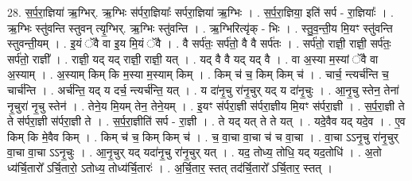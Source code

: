 \documentclass[17pt]{extarticle}
\begin{document}
28. स॒र्प॒रा॒ज्ञिया॑ ऋ॒ग्भिर्. ऋ॒ग्भिः स॑र्परा॒ज्ञियाः᳚ सर्परा॒ज्ञिया॑ ऋ॒ग्भिः । . स॒र्प॒रा॒ज्ञिया॒ इति॑ सर्प - रा॒ज्ञियाः᳚ । . ऋ॒ग्भिः स्तु॑वन्ति स्तुवन् त्यृ॒ग्भिर्. ऋ॒ग्भिः स्तु॑वन्ति । . ऋ॒ग्भिरित्यृ॑क् - भिः । . स्तु॒व॒न्ती॒य मि॒यꣳ स्तु॑वन्ति स्तुवन्ती॒यम् । . इ॒यं ॅवै वा इ॒य मि॒यं ॅवै । . वै सर्प॑तः॒ सर्प॑तो॒ वै वै सर्प॑तः । . सर्प॑तो॒ राज्ञी॒ राज्ञी॒ सर्प॑तः॒ सर्प॑तो॒ राज्ञी᳚ । . राज्ञी॒ यद् यद् राज्ञी॒ राज्ञी॒ यत् । . यद् वै वै यद् यद् वै । . वा अ॒स्या म॒स्यां ॅवै वा अ॒स्याम् । . अ॒स्याम् किम् कि म॒स्या म॒स्याम् किम् । . किम् च॑ च॒ किम् किम् च॑ । . चार्च॒ न्त्यर्च॑न्ति च॒ चार्च॑न्ति । . अर्च॑न्ति॒ यद् य दर्च॒ न्त्यर्च॑न्ति॒ यत् । . य दा॑नृ॒चु रा॑नृ॒चुर् यद् य दा॑नृ॒चुः । . आ॒नृ॒चु स्तेन॒ तेना॑ नृ॒चुरा॑ नृ॒चु स्तेन॑ । . तेने॒य मि॒यम् तेन॒ तेने॒यम् । . इ॒यꣳ स॑र्परा॒ज्ञी स॑र्परा॒ज्ञीय मि॒यꣳ स॑र्परा॒ज्ञी । . स॒र्प॒रा॒ज्ञी ते ते स॑र्परा॒ज्ञी स॑र्परा॒ज्ञी ते । . स॒र्प॒रा॒ज्ञीति॑ सर्प - रा॒ज्ञी । . ते यद् यत् ते ते यत् । . यदे॒वैव यद् यदे॒व । . ए॒व किम् कि मे॒वैव किम् । . किम् च॑ च॒ किम् किम् च॑ । . च॒ वा॒चा वा॒चा च॑ च वा॒चा । . वा॒चा ऽऽनृ॒चु रा॑नृ॒चुर् वा॒चा वा॒चा ऽऽनृ॒चुः । . आ॒नृ॒चुर् यद् यदा॑नृ॒चु रा॑नृ॒चुर् यत् । . यद॒ तोध्य॒ तोधि॒ यद् यद॒तोधि॑ । . अ॒तो ध्य॑र्चि॒तारो᳚ ऽर्चि॒तारो॒ ऽतोध्य॒ तोध्य॑र्चि॒तारः॑ । . अ॒र्चि॒तार॒ स्तत् तद॑र्चि॒तारो᳚ ऽर्चि॒तार॒ स्तत् । \newline
\end{document}
